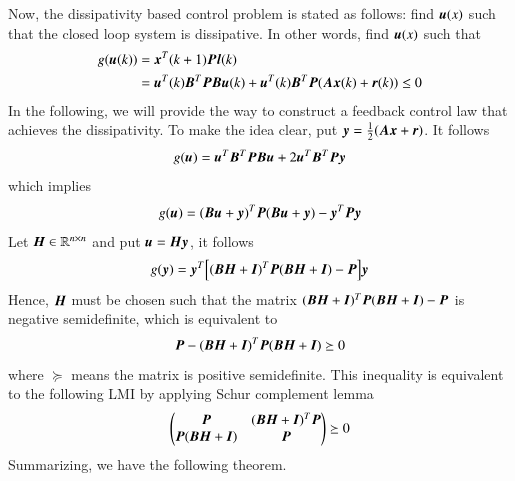 \documentclass[preprint,authoryear,12pt]{elsarticle}
\renewcommand{\vec}[1]{\mbox{\boldmath$#1$}}
\newcommand{\mat}[1]{\mbox{\boldmath$#1$}}
\begin{document}
Now, the dissipativity based control problem is stated as follows:
find $\vec{u}(x)$ such that the closed loop system is dissipative. In
other words, find $\vec{u}(x)$ such that
\begin{align}\label{pbc0}
g(\vec{u}(k))&=\vec{x}^T(k+1)\mat{P}\vec{l}(k)\nonumber\\
&=\vec{u}^T(k)\mat{B}^T\mat{P}\mat{B}\vec{u}(k)
+\vec{u}^T(k)\mat{B}^T\mat{P}(\mat{A}\vec{x}(k)+\vec{r}(k))\leq 0
\end{align}
In the following, we will provide the way to construct a feedback
control law that achieves the dissipativity. To make the idea clear,
put $\vec{y}=\frac{1}{2}(\mat{A}\vec{x}+\vec{r})$. It follows 
\begin{equation}\label{pbc}
g(\vec{u})=\vec{u}^T\mat{B}^T\mat{P}\mat{B}\vec{u}+2\vec{u}^T\mat{B}^T\mat{P}\vec{y}
\end{equation}
which implies
$$g(\vec{u})=(\mat{B}\vec{u}
+\vec{y})^T \mat{P} (\mat{B}\vec{u}
+\vec{y})-\vec{y}^T
\mat{P}\vec{y}$$
Let $\mat{H}\in\mathbb{R}^{n\times n}$ and put
$\vec{u}=\mat{H}\vec{y}$, it follows
$$g(\vec{y})= \vec{y}^T\Bigl[(\mat{B}\mat{H}+\mat{I})^T \mat{P}
(\mat{B}\mat{H}+\mat{I})-\mat{P}\Bigr]\vec{y}
$$
Hence, $\mat{H}$ must be chosen such that the matrix
$(\mat{B}\mat{H}+\mat{I})^T \mat{P}
(\mat{B}\mat{H}+\mat{I})-\mat{P}$ is negative
semidefinite, which is equivalent to
$$\mat{P}-(\mat{B}\mat{H}+\mat{I})^T \mat{P}
(\mat{B}\mat{H}+\mat{I})\succeq 0$$
where $\succeq$ means the matrix is positive semidefinite.
This inequality is equivalent to the following LMI by applying Schur
complement lemma \citep{boyd_linear_1994}
$$\begin{pmatrix}
\mat{P}& (\mat{B}\mat{H}+\mat{I})^T \mat{P} \\
\mat{P} (\mat{B}\mat{H}+\mat{I})  & \mat{P}
\end{pmatrix}\succeq 0$$
Summarizing, we have the following theorem. 
\end{document}
